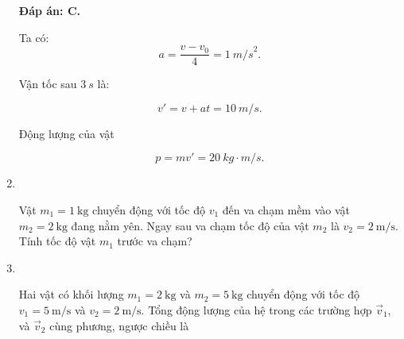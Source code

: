 \begin{enumerate}[label=\bfseries Câu \arabic*:, leftmargin=1.5cm]
\hideall
{	
	\textbf{Đáp án: C.}
	
	Ta có: $$a = \dfrac{v - v_0}{4} = \SI{1}{m/s}^2.$$
	
	Vận tốc sau $\SI{3}{s}$ là:
	
	$$v' = v + at = \SI{10}{m/s}.$$
	
	Động lượng của vật
	
	$$ p =mv' = \SI{20}{kg \cdot m/s}.$$
}

\item {}\\
{Vật $m_1=\SI{1}{\kilogram}$ chuyển động với tốc độ $v_1$ đến va chạm mềm vào vật $m_2 =\SI{2}{\kilogram}$ đang nằm yên. Ngay sau va chạm tốc độ của vật $m_2$ là $v_2 =\SI{2}{\meter/\second}$. Tính tốc độ vật $m_1$ trước va chạm? 
}

\item {}\\
{Hai vật có khối lượng $m_1 =\SI{2}{\kilogram}$ và $m_2 =\SI{5}{\kilogram}$ chuyển động với tốc độ $v_1 =\SI{5}{\meter/\second}$ và $v_2 =\SI{2}{\meter/\second}$. Tổng động lượng của hệ trong các trường hợp $\vec v_1$, và $\vec v_2$ cùng phương, ngược chiều là
}


\end{enumerate}
